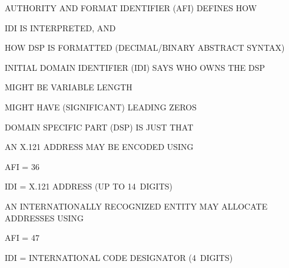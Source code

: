 \begin{bwslide}

\begin{nrtc}
\item	AUTHORITY AND FORMAT IDENTIFIER (AFI) DEFINES HOW
    \begin{nrtc}
    \item	IDI IS INTERPRETED, AND

    \item	HOW DSP IS FORMATTED (DECIMAL/BINARY ABSTRACT SYNTAX)
    \end{nrtc}

\item	INITIAL DOMAIN IDENTIFIER (IDI) SAYS WHO OWNS THE DSP
    \begin{nrtc}
    \item	MIGHT BE VARIABLE LENGTH

    \item	MIGHT HAVE (SIGNIFICANT) LEADING ZEROS
    \end{nrtc}

\item	DOMAIN SPECIFIC PART (DSP) IS JUST THAT
\end{nrtc}
\end{bwslide}


\begin{bwslide}

\begin{nrtc}
\item	AN X.121 ADDRESS MAY BE ENCODED USING
    \begin{nrtc}
    \item	AFI = 36

    \item	IDI = X.121 ADDRESS (UP TO 14~DIGITS)
    \end{nrtc}
\end{nrtc}

\end{bwslide}


\begin{bwslide}

\begin{nrtc}
\item	AN INTERNATIONALLY RECOGNIZED ENTITY MAY ALLOCATE ADDRESSES USING
    \begin{nrtc}
    \item	AFI = 47

    \item	IDI = INTERNATIONAL CODE DESIGNATOR (4~DIGITS)
    \end{nrtc}
\end{nrtc}

\end{bwslide}


